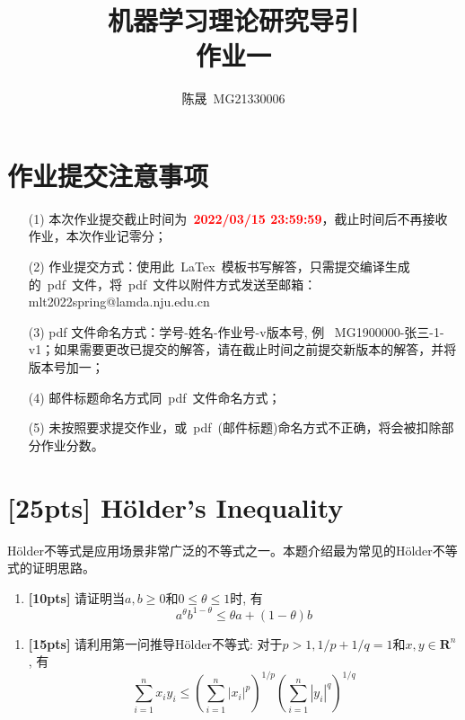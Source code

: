 \documentclass[a4paper,UTF8]{article}
\numberwithin{equation}{section}
\begin{document}
\title{机器学习理论研究导引\\
作业一}
\author{陈晟\, MG21330006} 
\maketitle

\section*{作业提交注意事项}
\begin{tcolorbox}
\begin{enumerate}
  \item[(1)] 本次作业提交截止时间为~\textcolor{red}{\textbf{2022/03/15  23:59:59}}，截止时间后不再接收作业，本次作业记零分；
  \item[(2)] 作业提交方式：使用此~LaTex~模板书写解答，只需提交编译生成的~pdf~文件，将~pdf~文件以附件方式发送至邮箱：mlt2022spring@lamda.nju.edu.cn
  \item[(3)] pdf 文件命名方式：学号-姓名-作业号-v版本号, 例~ MG1900000-张三-1-v1；如果需要更改已提交的解答，请在截止时间之前提交新版本的解答，并将版本号加一；
  \item[(4)] 邮件标题命名方式同~pdf~文件命名方式；
  \item[(5)] 未按照要求提交作业，或~pdf~(邮件标题)命名方式不正确，将会被扣除部分作业分数。

\end{enumerate}
\end{tcolorbox}


\newpage
\section{[25pts] Hölder's Inequality}
Hölder不等式是应用场景非常广泛的不等式之一。本题介绍最为常见的Hölder不等式的证明思路。
\begin{enumerate}[(1)]
	\item \textbf{[10pts]} 请证明当$a,b\geq 0$和$0\leq\theta\leq 1$时, 有
\begin{equation}
	\label{eq1}
	a^{\theta} b^{1-\theta} \leq \theta a+(1-\theta) b
\end{equation}
\end{enumerate}
\begin{enumerate}[(2)]
	\item \textbf{[15pts]} 请利用第一问推导Hölder不等式: 对于$p>1,1/p+1/q=1$和$x,y\in\boldsymbol{R}^n$, 有
\begin{equation}
	\sum_{i=1}^{n} x_{i} y_{i} \leq\left(\sum_{i=1}^{n}\left|x_{i}\right|^{p}\right)^{1 / p}\left(\sum_{i=1}^{n}\left|y_{i}\right|^{q}\right)^{1 / q}
\end{equation}
\end{enumerate}
\end{document}
